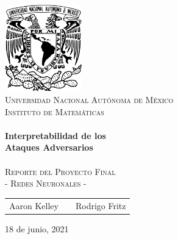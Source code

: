 \begin{titlepage}
    \begin{center}
    
    \includegraphics[width=0.25\textwidth]{resources/unam_escudo.png}~\\[0.2cm]
    \textsc{\huge Universidad Nacional Autónoma de México}\\[0.5cm]  
    \textsc{\LARGE Instituto de Matemáticas}\\[2cm]
    
    \HRule \\[0.5cm] 
    {\Huge \bfseries Interpretabilidad de los \\[1cm] Ataques Adversarios} \\[0.3cm] 
    \HRule \\[0.5cm]
    
    \textsc{\LARGE Reporte del Proyecto Final}\\[0.4cm]
    \textsc{\LARGE - Redes Neuronales - }\\[3cm]
    

    {\Large
    \begin{tabular}{ccc}
        Aaron Kelley & \hspace{1.5in} & Rodrigo Fritz
    \end{tabular}
    }
    \vfill

    {\Large 18 de junio, 2021}
    
    \end{center} 
    \end{titlepage}